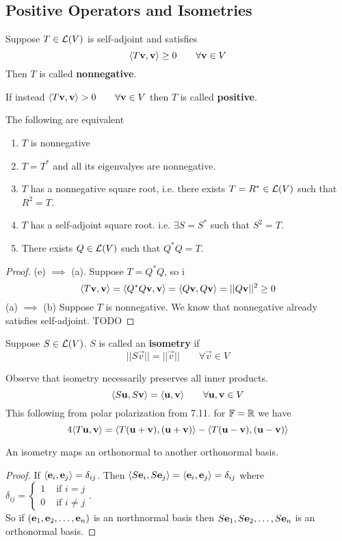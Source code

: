 \subsection{Positive Operators and Isometries}
\begin{definition}
	Suppose $T \in \mathcal L(V)$ is self-adjoint and satisfies 
	\[ \langle T\mathbf v, \mathbf v \rangle \geq 0 \qquad \forall \mathbf v \in V\]
	Then $T$ is called \textbf{nonnegative}.

	\noindent If instead $\langle T\mathbf v, \mathbf v\rangle > 0 \qquad \forall \mathbf v \in V$ then $T$ is called \textbf{positive}.
\end{definition}
\begin{theorem}
	The following are equivalent
	\begin{enumerate}
		\item $T$ is nonnegative
		\item $T = T^*$ and all its eigenvalyes are nonnegative.
		\item $T$ has a nonnegative square root, i.e. there exists $T = R^* \in \mathcal L(V)$ such that $R^2 = T$. 
		\item $T$ has a self-adjoint square root. i.e. $\exists S = S^*$ such that $S^2 = T$.
		\item There exists $Q \in \mathcal L(V)$ such that $Q^*Q = T$.
	\end{enumerate}
\end{theorem}
\newpage
\begin{proof}
	(e) $\implies$ (a). Suppose $T = Q^*Q$, so i
	\[ \langle T\mathbf v, \mathbf v \rangle = \langle Q^*Q\mathbf v, \mathbf v \rangle = \langle Q\mathbf v, Q\mathbf v \rangle = ||Q\mathbf v||^2 \geq 0\]
	(a) $\implies$ (b) Suppose $T$ is nonnegative. We know that nonnegative already satisfies self-adjoint. TODO
\end{proof}
\begin{definition}
	Suppose $S \in \mathcal L(V)$. $S$ is called an \textbf{isometry} if 
	\[ ||S\vec v|| = ||\vec v|| \qquad \forall \vec v \in V\]
\end{definition}
\begin{remark}
	Observe that isometry necessarily preserves all inner products.
	\[ \langle S\mathbf u, S \mathbf v \rangle = \langle \mathbf u, \mathbf v \rangle \qquad \forall \mathbf u, \mathbf v \in V\] 
	This following from polar polarization from 7.11. for $\mathbb F = \mathbb R$ we have 
	\[ 4\langle T\mathbf u, \mathbf v \rangle = \langle T(\mathbf u + \mathbf v), (\mathbf u + \mathbf v) \rangle - \langle T(\mathbf u - \mathbf v), (\mathbf u - \mathbf v )\rangle\]
\end{remark}
\begin{corollary}
	An isometry maps an orthonormal to another orthonormal basis.
\end{corollary}
\begin{proof}
	If $\langle \mathbf e_i, \mathbf e_j \rangle = \delta_{ij}$. Then $\langle S\mathbf e_i, S\mathbf e_j \rangle = \langle \mathbf e_i, \mathbf e_j \rangle = \delta_{ij}$ where $\delta_{ij} = \left\{ \begin{array}{cc} 
	1 & \text{ if } i = j \\ 0 & \text{ if } i \neq j \end{array} \right.$. \\
	So if $({\mathbf e}_1,{\mathbf e}_2, \ldots, {\mathbf e}_{n})$ is an northnormal basis then ${S\mathbf e}_1,{S\mathbf e}_2, \ldots, {S\mathbf e}_{n}$ is an orthonormal basis.  
\end{proof}
\newpage
